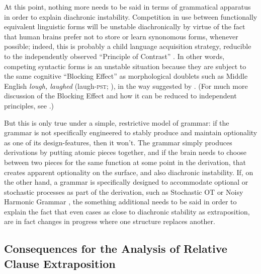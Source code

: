 At this point, nothing more needs to be said in terms of grammatical apparatus in order to explain diachronic instability. Competition in use between functionally equivalent linguistic forms will be unstable diachronically by virtue of the fact that human brains prefer not to store or learn synonomous forms, whenever possible; indeed, this is probably a child language acquisition strategy, reducible to the independently observed ``Principle of Contrast'' \citep[][inter alia]{clark1987, clark1990}. In other words, competing syntactic forms is an unstable situation because they are subject to the same cognitive ``Blocking Effect'' as morphological doublets such as Middle English \textsl{lough, laughed} (laugh-\textsc{pst}; \citealt{taylor1994}), in the way suggested by \citet{kroch1994}.  (For much more discussion of the Blocking Effect and how it can be reduced to independent principles, see \citealt{fruehwaldwallenberginprep}.)

But this is only true under a simple, restrictive model of grammar: if the grammar is not specifically engineered to stably produce and maintain optionality as one of its design-features, then it won't. The grammar simply produces derivations by putting atomic pieces together, and if the brain needs to choose between two pieces for the same function at some point in the derivation, that creates apparent optionality on the surface, and also diachronic instability. If, on the other hand, a grammar is specifically designed to accommodate optional or stochastic processes as part of the derivation, such as Stochastic OT \citep{boersmahayes2001} or Noisy Harmonic Grammar \citep[][and much subsequent work]{boersmapater2008, pater2008}, the something additional needs to be said in order to explain the fact that even cases as close to diachronic stability as extraposition, are in fact changes in progress where one structure replaces another.

\subsection{Consequences for the Analysis of Relative Clause Extraposition}

